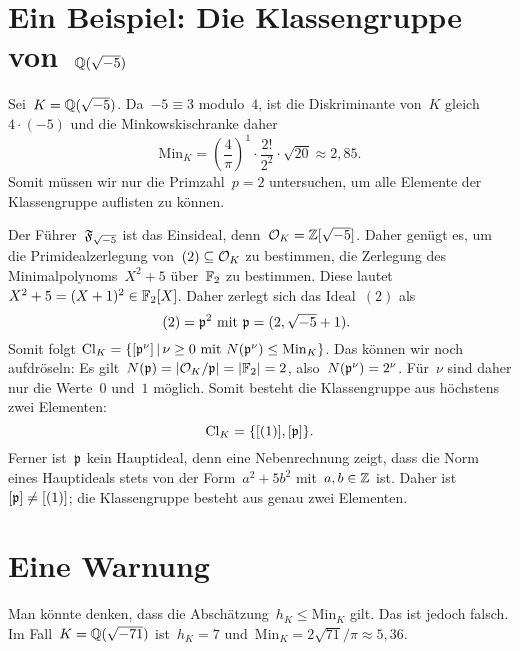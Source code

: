\documentclass{uebblatt}
\newcommand{\Cl}{\mathrm{Cl}}
\newcommand{\Min}{\mathrm{Min}}
\begin{document}
\newpage
\section*{Ein Beispiel: Die Klassengruppe von~$\mathbb{Q}(\sqrt{-5})$}

Sei~$K = \mathbb{Q}(\sqrt{-5})$. Da~$-5 \equiv 3$ modulo~$4$, ist die Diskriminante
von~$K$ gleich~$4 \cdot (-5)$ und die Minkowskischranke daher
\[ \Min_K = \left(\frac{4}{\pi}\right)^1 \cdot \frac{2!}{2^2} \cdot \sqrt{20}
  \approx 2{,}85. \]
Somit müssen wir nur die Primzahl~$p = 2$ untersuchen, um alle Elemente der
Klassengruppe auflisten zu können.

Der Führer~$\mathfrak{F}_{\sqrt{-5}}$ ist das Einsideal, denn~$\mathcal{O}_K = \mathbb{Z}[\sqrt{-5}]$.
Daher genügt es, um die Primidealzerlegung von~$(2) \subseteq \mathcal{O}_K$ zu
bestimmen, die Zerlegung des Minimalpolynoms~$X^2 + 5$ über~$\mathbb{F}_2$ zu
bestimmen. Diese lautet
$X^2 + 5 = (X + 1)^2 \in \mathbb{F}_2[X]$.
Daher zerlegt sich das Ideal~$(2)$ als
\[ \text{$(2) = \mathfrak{p}^2$ mit~$\mathfrak{p} = (2, \sqrt{-5} + 1)$. } \]
Somit folgt
$\Cl_K = \{ [\ppp^\nu] \,|\, \text{$\nu \geq 0$ mit~$N(\ppp^\nu) \leq
\Min_K$} \}$.
Das können wir noch aufdröseln: Es gilt~$N(\mathfrak{p}) = |\mathcal{O}_K/\mathfrak{p}| = |\mathbb{F}_2| = 2$,
also~$N(\mathfrak{p}^\nu) = 2^\nu$. Für~$\nu$ sind daher nur die Werte~$0$ und~$1$
möglich. Somit besteht die Klassengruppe aus höchstens zwei
Elementen:
\[ \Cl_K = \{ [(1)], [\ppp] \}. \]
Ferner ist~$\mathfrak{p}$ kein Hauptideal, denn eine Nebenrechnung zeigt, dass die Norm
eines Hauptideals stets von der Form~$a^2 + 5b^2$ mit~$a,b \in \mathbb{Z}$ ist. Daher
ist~$[\mathfrak{p}] \neq [(1)]$; die Klassengruppe besteht aus genau zwei Elementen.


\section*{Eine Warnung}

Man könnte denken, dass die Abschätzung~$h_K \leq \Min_K$ gilt. Das ist jedoch
falsch. Im Fall~$K = \mathbb{Q}(\sqrt{-71})$ ist~$h_K = 7$ und~$\Min_K =
2\sqrt{71}/\pi \approx 5{,}36$.
\end{document}
